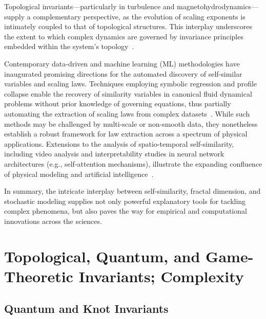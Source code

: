 Topological invariants—particularly in turbulence and magnetohydrodynamics—supply a complementary perspective, as the evolution of scaling exponents is intimately coupled to that of topological structures. This interplay underscores the extent to which complex dynamics are governed by invariance principles embedded within the system's topology~\cite{ref60}.

Contemporary data-driven and machine learning (ML) methodologies have inaugurated promising directions for the automated discovery of self-similar variables and scaling laws. Techniques employing symbolic regression and profile collapse enable the recovery of similarity variables in canonical fluid dynamical problems without prior knowledge of governing equations, thus partially automating the extraction of scaling laws from complex datasets~\cite{ref65}. While such methods may be challenged by multi-scale or non-smooth data, they nonetheless establish a robust framework for law extraction across a spectrum of physical applications. Extensions to the analysis of spatio-temporal self-similarity, including video analysis and interpretability studies in neural network architectures (e.g., self-attention mechanisms), illustrate the expanding confluence of physical modeling and artificial intelligence~\cite{ref39}.

\vspace{1em}

In summary, the intricate interplay between self-similarity, fractal dimension, and stochastic modeling supplies not only powerful explanatory tools for tackling complex phenomena, but also paves the way for empirical and computational innovations across the sciences.

\section{Topological, Quantum, and Game-Theoretic Invariants; Complexity}

\subsection{Quantum and Knot Invariants}

